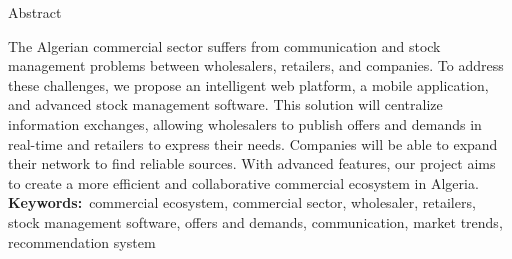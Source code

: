 \documentclass[edit,12pt,a4paper,ChapStyle,oneside,doubleinterligne]{report}
\begin{document}
\begin{center}
    \huge{Abstract} 
    \end{center}
    \phantom{hhhh}The Algerian commercial sector suffers from communication and stock management problems between wholesalers, retailers, and companies. To address these challenges, we propose an intelligent web platform, a mobile application, and advanced stock management software. This solution will centralize information exchanges, allowing wholesalers to publish offers and demands in real-time and retailers to express their needs. Companies will be able to expand their network to find reliable sources. With advanced features, our project aims to create a more efficient and collaborative commercial ecosystem in Algeria.
    \textbf{Keywords:}~commercial ecosystem, commercial sector, wholesaler, retailers, stock management software, offers and demands, communication, market trends, recommendation system

    

\newpage 
\thispagestyle{empty}
\tableofcontents
\thispagestyle{empty}
\listoffigures
\thispagestyle{empty}
\listoftables
\thispagestyle{empty}
\newpage
\end{document}
